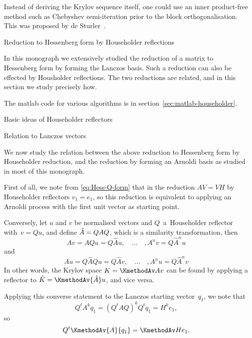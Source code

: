 \documentclass[11pt]{artikel3}
\begin{document}
\begin{Outline}
Instead of deriving the Krylov sequence itself, one could use an inner
product-free method such as Chebyshev semi-iteration prior to the
block orthogonalisation. This was proposed by de
Sturler~\cite{Sturler:restructured}.

 {Reduction to Hessenberg form by Householder reflections}
\label{sec:householder}
\FurtherReading

In this monograph we extensively studied the reduction of a matrix
to Hessenberg form by forming the Lanczos basis.
Such a reduction can also be effected by Housholder reflections.
The two reductions are related, and in this section we study precisely how.

The matlab code for various algorithms
is in section~\ref{sec:matlab-householder}.

 {Basic ideas of Householder reflectors}



 {Relation to Lanczos vectors}

We now study the relation between the above reduction to Hessenberg
form by Householder reduction, and the reduction by forming
an Arnoldi basis as studied in most of this monograph.

First of all,
we note from \eqref{eq:Hess-Q-form}
that in the reduction $AV=VH$ by Householder reflectors $v_1=e_1$,
so this reduction is equivalent to applying an Arnoldi process 
with the first unit vector as starting point.

Conversely, let $u$ and $v$ be normalised vectors and $Q$~a~Householder
reflector with~$v=Qu$, and define $\hat A=\nobreak QAQ$, 
which is a similarity transformation, then
\[ Av=AQu=Q\hat Au,\quad\ldots\quad, A^nv=Q\hat A^n u \]
and
\[ Au=Q\hat AQu=Q\hat Av,\quad\ldots\quad, A^nu=Q\hat A^nv \]
In other words, the Krylov space $K=\KmethodAv Av$ can be found
by applying a reflector to $\hat K=\KmethodAv {\hat A}u$, and vice versa.

Applying this converse statement to the Lanczos starting vector~$q_1$,
we note that
\[ Q^tA^kq_1=(Q^tAQ)^kQ^tq_1=H^ke_1, \]
so \[ Q^t\KmethodAv{A}{q_1}=\KmethodAv H{e_1}. \]

\begin{comment}
This can be carried over to residuals:
 \[ \begin{cases}K=E\hat K\cr R=KU\end{cases}\Rightarrow
    \hbox{$R=E\hat R$ where $\hat R$ is}. \]
\end{comment}


\end{Outline}
\end{document}
